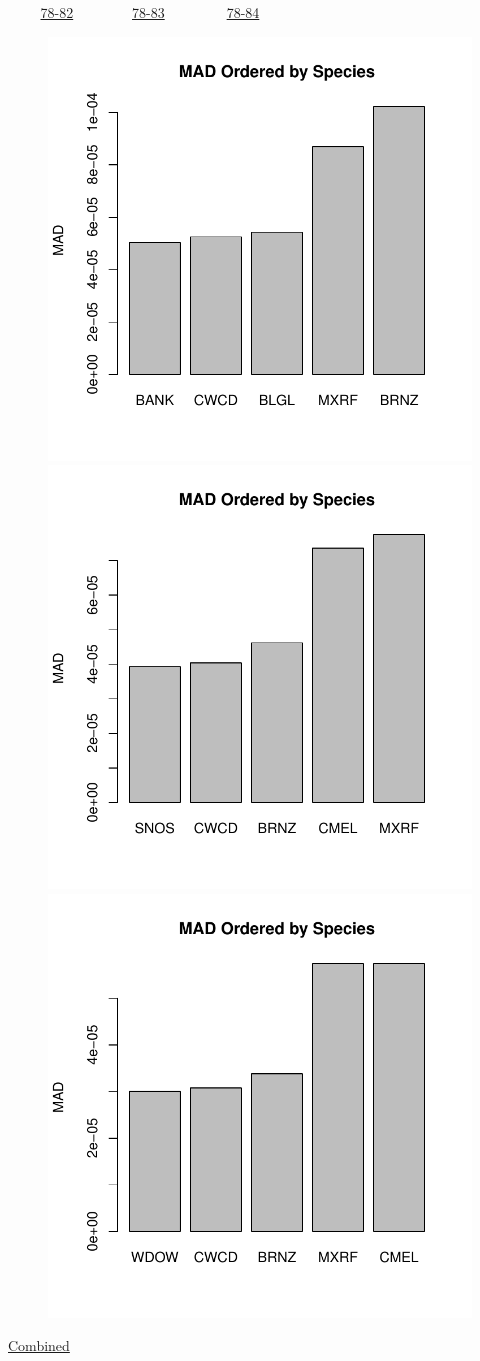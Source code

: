 \documentclass[ xcolor = pdftex, dvipsnames, table ]{beamer}
\begin{document}
%
\begin{frame}{$~~~~~~~~~$ \href{https://github.com/gasduster99/sppComp/tree/master/sscRuns/25019781982M4}{78-82} $~~~~~~~~~~~~~~~~$ \href{https://github.com/gasduster99/sppComp/tree/master/sscRuns/25019781983M4}{78-83} $~~~~~~~~~~~~~~~~~$ \href{https://github.com/gasduster99/sppComp/tree/master/sscRuns/25019781984M4}{78-84} }	
	\begin{figure}[ht!]
        \centering
	\hspace*{-1cm}
        \includegraphics[width=.4\textwidth]{../sscRuns/25019781982M4/sppTailMad68.pdf}
        \includegraphics[width=.4\textwidth]{../sscRuns/25019781983M4/sppTailMad68.pdf}
	\includegraphics[width=.4\textwidth]{../sscRuns/25019781984M4/sppTailMad68.pdf}
	\end{figure}
	\vspace{-1cm}
	\begin{center}
	\Large
	\href{https://github.com/gasduster99/sppComp/tree/master/try1/postSSC/25019781982345M4}{Combined}
	\end{center}
\end{frame}
\end{document}
